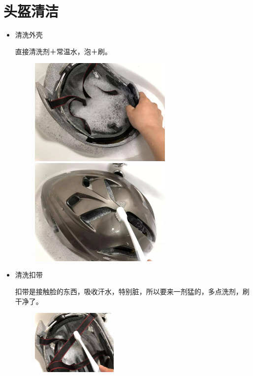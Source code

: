 \documentclass{ctexbook}
\begin{document}
\section{头盔清洁}
\label{sec:头盔清洁}
\begin{itemize}

\item 清洗外壳

直接清洗剂＋常温水，泡＋刷。
\begin{figure}[ht]
\centering
\includegraphics[width=7cm]{fig/头盔清洁1}
\hspace{10pt}  %
\includegraphics[width=7cm]{fig/头盔清洁2}
\end{figure}

\item 清洗扣带

扣带是接触脸的东西，吸收汗水，特别脏，所以要来一剂猛的，多点洗剂，刷干净了。

\begin{figure}[H]
    \begin{center}
    \includegraphics[width=0.4\textwidth]{fig/头盔清洁3}
    \end{center}
\end{figure}


\end{itemize}
\end{document}
